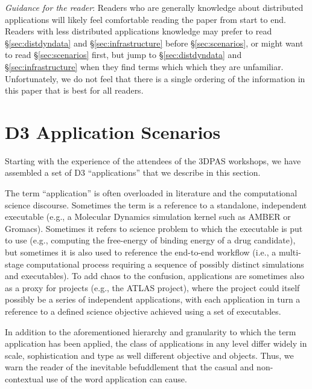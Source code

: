 \textit{Guidance for the reader}: Readers who are generally knowledge about distributed
applications will likely feel comfortable reading the paper from start to end.
Readers with less distributed applications knowledge may prefer to read
\S\ref{sec:distdyndata} and \S\ref{sec:infrastructure} before \S\ref{sec:scenarios},
or might want to read \S\ref{sec:scenarios} first, but jump to \S\ref{sec:distdyndata} and \S\ref{sec:infrastructure} when they find terms which which they are unfamiliar.
Unfortunately, we do not feel that there is a single ordering of the information in this
paper that is best for all readers.

\section{D3 Application Scenarios \label{sec:scenarios}}

Starting with the experience of the attendees of the 3DPAS workshops, we have
assembled a set of D3 ``applications'' that we describe in this section.  

The term ``application'' is often overloaded in literature and the computational
science discourse.  Sometimes the term is a reference to a standalone,
independent executable (e.g., a Molecular Dynamics simulation kernel such as
AMBER or Gromacs). Sometimes it refers to science problem to which
the executable is put to use (e.g., computing the free-energy of binding energy of
a drug candidate), but sometimes it is also used to reference the end-to-end
workflow (i.e., a multi-stage computational process requiring a sequence of
possibly distinct simulations and executables).  To add chaos to the confusion,
applications are sometimes also as a proxy for projects (e.g., the ATLAS
project), where the project could itself possibly be a series of
independent applications, with each application in turn a reference to a defined
science objective achieved using a set of executables.

In addition to the aforementioned hierarchy and granularity to which the term
application has been applied, the class of applications in any level differ
widely in scale, sophistication and type as well different objective and
objects.  Thus, we warn the reader of the inevitable befuddlement that the
casual and non-contextual use of the word application can cause.



